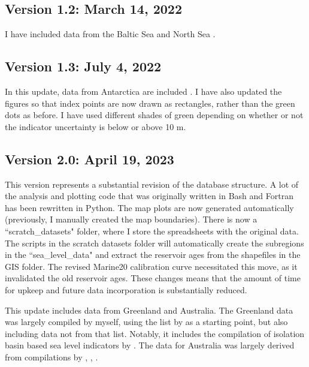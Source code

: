 \subsection{Version 1.2: March 14, 2022}

I have included data from the Baltic Sea \citep{RosentauEtal2021} and North Sea \citep{VinkEtal2007}.

\subsection{Version 1.3: July 4, 2022}

In this update, data from Antarctica are included \citep{BriggsTarasov2013,IshiwaEtal2021}. I have also updated the figures so that index points are now drawn as rectangles, rather than the green dots as before. I have used different shades of green depending on whether or not the indicator uncertainty is below or above 10 m.

\subsection{Version 2.0: April 19, 2023}

This version represents a substantial revision of the database structure. A lot of the analysis and plotting code that was originally written in Bash and Fortran has been rewritten in Python. The map plots are now generated automatically (previously, I manually created the map boundaries). There is now a ``scratch\_datasets" folder, where I store the spreadsheets with the original data. The scripts in the scratch datasets folder will automatically create the subregions in the ``sea\_level\_data" and extract the reservoir ages from the shapefiles in the GIS folder. The revised Marine20 calibration curve necessitated this move, as it invalidated the old reservoir ages. These changes means that the amount of time for upkeep and future data incorporation is substantially reduced.

This update includes data from Greenland and Australia. The Greenland data was largely compiled by myself, using the list by \citet{LecavalierEtal2014} as a starting point, but also including data not from that list. Notably, it includes the compilation of isolation basin based sea level indicators by \citet{LongEtal2011}. The data for Australia was largely derived from compilations by \citet{LewisEtal2013}, \citet{SlossEtal2007}, \citet{BelperioEtal2002}.

